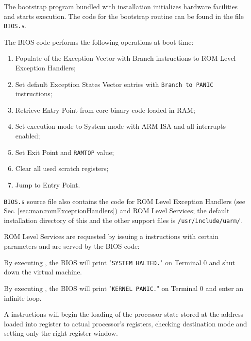 
\label{sec:man:bios}


The bootstrap program bundled with \uarm{} installation initializes hardware facilities and starts execution.
The code for the bootstrap routine can be found in the file \texttt{BIOS.s}.

The BIOS code performs the following operations at boot time:

\begin{enumerate}
\item Populate of the Exception Vector with Branch instructions to ROM Level Exception Handlers;
\item Set default Exception States Vector entries with \texttt{Branch to PANIC} instructions;
\item Retrieve Entry Point from core binary code loaded in RAM;
\item Set execution mode to System mode with ARM ISA and all interrupts enabled;
\item Set Exit Point and \texttt{RAMTOP} value;
\item Clear all used scratch registers;
\item Jump to Entry Point.
\end{enumerate}

\texttt{BIOS.s} source file also contains the code for ROM Level Exception Handlers (see Sec. \ref{sec:man:romExceptionHandlers}) and ROM Level Services; the default installation directory of this and the other support files is \texttt{/usr/include/uarm/}.


ROM Level Services are requested by issuing a  instructions with certain parameters and are served by the BIOS code:


By executing , the BIOS will print "\texttt{SYSTEM HALTED.}" on Terminal 0 and shut down the virtual machine.


By executing , the BIOS will print "\texttt{KERNEL PANIC.}" on Terminal 0 and enter an infinite loop.


A  instructions will begin the loading of the processor state stored at the address loaded into  register to actual processor's registers, checking destination mode and setting only the right register window.

